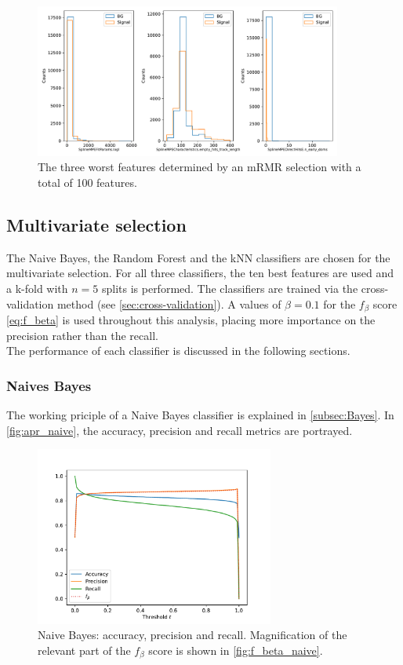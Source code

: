 \begin{figure}
    \centering
    \includegraphics[width=0.9\textwidth]{content/plots/worst_3_features.pdf}
    \caption{The three worst features determined by an mRMR selection with a total of 100 features.}
    \label{fig:worst_features}
\end{figure}

\subsection{Multivariate selection}
The Naive Bayes, the Random Forest and the kNN classifiers are chosen for the multivariate selection. For all three classifiers, the ten best features are used and a k-fold with $n=\num{5}$ splits is performed. The classifiers are 
trained via the cross-validation method (see \autoref{sec:cross-validation}). A values of $\beta=0.1$ for the $f_{\beta}$ score \eqref{eq:f_beta} is used throughout this analysis, placing more importance on the precision rather 
than the recall. \\
The performance of each classifier is discussed in the following sections.

\subsubsection{Naives Bayes}
The working priciple of a Naive Bayes classifier is explained in \autoref{subsec:Bayes}. In \autoref{fig:apr_naive}, the accuracy, precision and recall metrics are portrayed.
\begin{figure}
    \centering
    \includegraphics[width=0.7\textwidth]{content/plots/apr_naive.pdf}
    \caption{Naive Bayes: accuracy, precision and recall. Magnification of the relevant part of the $f_{\beta}$ score is shown in \autoref{fig:f_beta_naive}.} 
    \label{fig:apr_naive}
\end{figure}

